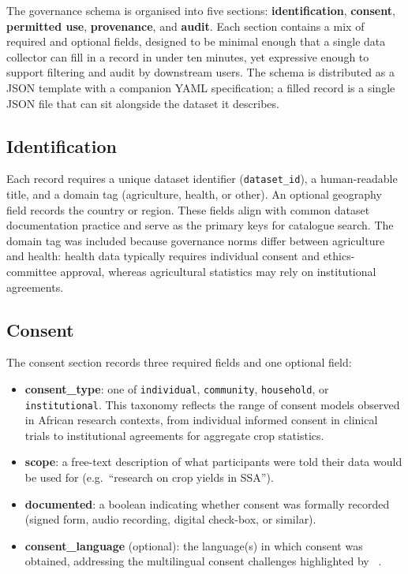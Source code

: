 \documentclass{article}
\begin{document}
The governance schema is organised into five sections: \textbf{identification}, \textbf{consent}, \textbf{permitted use}, \textbf{provenance}, and \textbf{audit}. Each section contains a mix of required and optional fields, designed to be minimal enough that a single data collector can fill in a record in under ten minutes, yet expressive enough to support filtering and audit by downstream users. The schema is distributed as a JSON template with a companion YAML specification; a filled record is a single JSON file that can sit alongside the dataset it describes.

\subsection{Identification}

Each record requires a unique dataset identifier (\texttt{dataset\_id}), a human-readable title, and a domain tag (agriculture, health, or other). An optional geography field records the country or region. These fields align with common dataset documentation practice \cite{gebru2021} and serve as the primary keys for catalogue search. The domain tag was included because governance norms differ between agriculture and health: health data typically requires individual consent and ethics-committee approval, whereas agricultural statistics may rely on institutional agreements.

\subsection{Consent}

The consent section records three required fields and one optional field:

\begin{itemize}
    \item \textbf{consent\_type}: one of \texttt{individual}, \texttt{community}, \texttt{household}, or \texttt{institutional}. This taxonomy reflects the range of consent models observed in African research contexts, from individual informed consent in clinical trials to institutional agreements for aggregate crop statistics.
    \item \textbf{scope}: a free-text description of what participants were told their data would be used for (e.g.\ ``research on crop yields in SSA'').
    \item \textbf{documented}: a boolean indicating whether consent was formally recorded (signed form, audio recording, digital check-box, or similar).
    \item \textbf{consent\_language} (optional): the language(s) in which consent was obtained, addressing the multilingual consent challenges highlighted by \citeauthor{omutoko2024}~.
\end{itemize}
\end{document}

